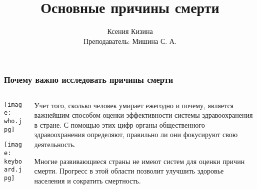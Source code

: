 \documentclass[10pt]{beamer}
\title{Основные причины смерти}
\author[К. Кизина]{Ксения Кизина \\ Преподаватель: Мишина С. А.}
\institute{МГМУ имени Сеченова}
\date{}
\begin{document}
	\begin{frame}
		\titlepage
	\end{frame}

	\begin{frame}
		\frametitle{Почему важно исследовать причины смерти}
		\begin{columns}
			\begin{column}{0.5\textwidth}
				\texttt{[image: who.jpg]}

				\texttt{[image: keyboard.jpg]}
			\end{column}
			\begin{column}{0.5\textwidth}
				\begin{block}{}
							
				   Учет того, сколько человек умирает ежегодно и почему,
				   является важнейшим способом оценки эффективности системы
				   здравоохранения в стране. С помощью этих цифр органы
				   общественного здравоохранения определяют, правильно ли они 
				   фокусируют свою деятельность. 	
				\end{block}
			 	\begin{block}{}
				   Многие развивающиеся страны не имеют систем для оценки причин смерти. 
				   Прогресс
				   в этой области  позволит улучшить здоровье населения и 
				   сократить смертность.
			   	\end{block}
			\end{column}
		\end{columns}
	\end{frame}
\end{document}

